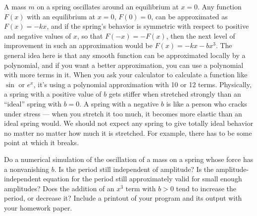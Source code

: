 A mass $m$ on a spring oscillates around an equilibrium at $x=0$. Any function $F(x)$
        with an equilibrium at $x=0$, $F(0)=0$, can be approximated as  $F(x)=-kx$,
        and if the spring's behavior
        is symmetric with respect to positive and negative values of $x$, so that $F(-x)=-F(x)$, then the next
        level of improvement in such an approximation would be $F(x)=-kx-bx^3$.
        The general idea here is that any smooth function
        can be approximated locally by a polynomial, and if you want a better approximation,
        you can use a polynomial with more terms in it. When you ask your calculator
        to calculate a function like $\sin$ or $e^x$, it's using a polynomial approximation
        with 10 or 12 terms. Physically,
        a spring with a positive value of $b$ gets stiffer when stretched strongly
        than an ``ideal'' spring with $b=0$. A spring with a negative $b$ is like a person
        who cracks under stress --- when you stretch it too much, it becomes more elastic
        than an ideal spring would. We should not expect any spring to give totally ideal
        behavior no matter no matter how much it is stretched. For example, there has to be
        some point at which it breaks.

        Do a numerical simulation of the oscillation of a mass on a spring whose
        force has a nonvanishing $b$. Is the
        period still independent of amplitude? Is the amplitude-independent equation
        for the period still approximately valid for small enough amplitudes? Does the
        addition of an $x^3$ term with $b>0$ tend to increase the period, or decrease it?
        Include a printout of your program and its output with your homework paper.

